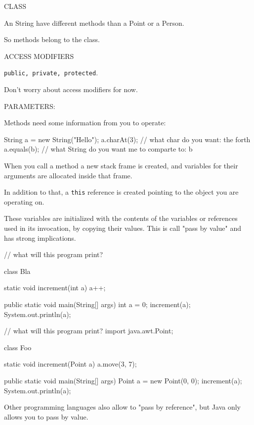 \documentclass[a4paper, 9pt]{extarticle}
\begin{document}
CLASS

An String have different methods than a Point or a Person.

So methods belong to the class.

ACCESS MODIFIERS

\verb+public, private, protected+.

Don't worry about access modifiers for now.

PARAMETERS:

Methods need some information from you to operate:

\begin{blackboard}
String a = new String("Hello");
a.charAt(3); // what char do you want: the forth
a.equals(b); // what String do you want me to comparte to: b
\end{blackboard}

When you call a method a new stack frame is created, and variables for their
arguments are allocated inside that frame.

In addition to that, a \verb+this+ reference is created pointing to the object
you are operating on.

These variables are initialized with the contents of the variables or
references used in its invocation, by copying their values. This is call "pass
by value" and has strong implications.

\newpage

\begin{multicols}{2}
\begin{blackboard}
// what will this program print?


class Bla {
  static void increment(int a) {
    a++;
  }

  public static void main(String[] args) {
    int a = 0;
    increment(a);
    System.out.println(a);
  }
}
\end{blackboard}
\columnbreak
\begin{blackboard}
// what will this program print?
import java.awt.Point;

class Foo {
  static void increment(Point a) {
    a.move(3, 7);
  }

  public static void main(String[] args) {
    Point a = new Point(0, 0);
    increment(a);
    System.out.println(a);
  }
}
\end{blackboard}
\end{multicols}

Other programming languages also allow to "pass by reference", but Java only
allows you to pass by value.
\end{document}
